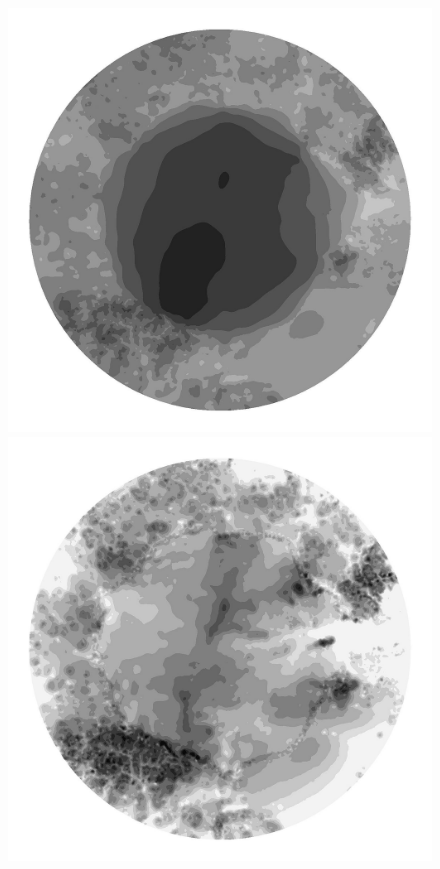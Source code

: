\begin{figure}
  \begin{minipage}[b]{0.30\linewidth}
    \includegraphics[width=1.0\textwidth]{images/EISMINT_II/Ubar/S_5000.jpg}
  \end{minipage}
  \quad
  \begin{minipage}[b]{0.30\linewidth}
    \includegraphics[width=1.0\textwidth]{images/EISMINT_II/Ubar/beta_5000.jpg}

\end{minipage}
\end{figure}
